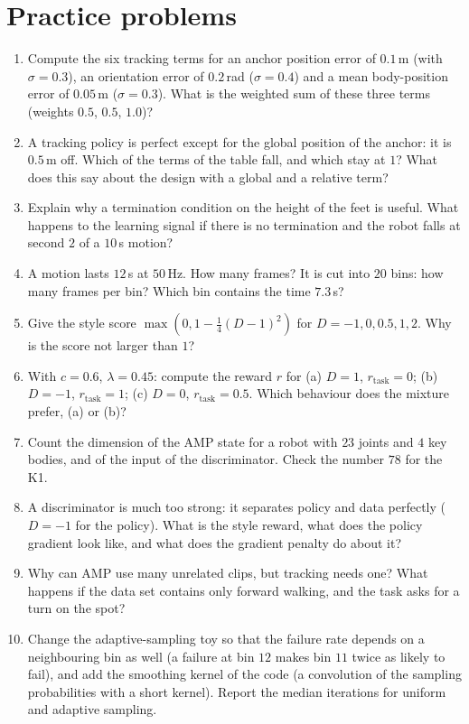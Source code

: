 \section*{Practice problems}
\begin{enumerate}[label=\textbf{\thechapter.\arabic*}]
  \item Compute the six tracking terms for an anchor position error of $0.1$\,m (with $\sigma=0.3$), an orientation error of $0.2$\,rad ($\sigma=0.4$) and a mean body-position error of $0.05$\,m ($\sigma=0.3$). What is the weighted sum of these three terms (weights $0.5$, $0.5$, $1.0$)?
  \item A tracking policy is perfect except for the global position of the anchor: it is $0.5$\,m off. Which of the terms of the table fall, and which stay at $1$? What does this say about the design with a global and a relative term?
  \item Explain why a termination condition on the height of the feet is useful. What happens to the learning signal if there is no termination and the robot falls at second $2$ of a $10$\,s motion?
  \item A motion lasts $12$\,s at $50$\,Hz. How many frames? It is cut into $20$ bins: how many frames per bin? Which bin contains the time $7.3$\,s?
  \item Give the style score $\max(0,1-\tfrac14(D-1)^2)$ for $D=-1,0,0.5,1,2$. Why is the score not larger than $1$?
  \item With $c=0.6$, $\lambda=0.45$: compute the reward $r$ for (a) $D=1$, $r_{\text{task}}=0$; (b) $D=-1$, $r_{\text{task}}=1$; (c) $D=0$, $r_{\text{task}}=0.5$. Which behaviour does the mixture prefer, (a) or (b)?
  \item Count the dimension of the AMP state for a robot with $23$ joints and $4$ key bodies, and of the input of the discriminator. Check the number $78$ for the K1.
  \item A discriminator is much too strong: it separates policy and data perfectly ($D=-1$ for the policy). What is the style reward, what does the policy gradient look like, and what does the gradient penalty do about it?
  \item Why can AMP use many unrelated clips, but tracking needs one? What happens if the data set contains only forward walking, and the task asks for a turn on the spot?
  \item[\textbf{\thechapter.10}$\star$] Change the adaptive-sampling toy so that the failure rate depends on a neighbouring bin as well (a failure at bin $12$ makes bin $11$ twice as likely to fail), and add the smoothing kernel of the code (a convolution of the sampling probabilities with a short kernel). Report the median iterations for uniform and adaptive sampling.
\end{enumerate}

